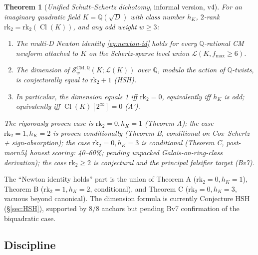\documentclass[11pt,a4paper]{amsart}
\newtheorem{theorem}{Theorem}[section]
\theoremstyle{definition}
\DeclareMathOperator{\Cl}{Cl}
\newcommand{\Q}{\mathbb{Q}}
\newcommand{\Lcal}{\mathcal{L}}
\newcommand{\Scal}{\mathcal{S}}
\newcommand{\hK}{h_{K}}
\newcommand{\rktwo}{\mathrm{rk}_2}
\begin{document}
\begin{theorem}[\emph{Unified Schutt--Schertz dichotomy}, informal version, v4]\label{thm:dichotomy-v4-informal}
For an imaginary quadratic field $K = \Q(\sqrt{D})$ with class number $\hK$, $2$-rank $\rktwo = \rktwo(\Cl(K))$, and any odd weight $w \ge 3$:
\begin{enumerate}[leftmargin=2em]
  \item The multi-D Newton identity \eqref{eq:newton-id} holds for every $\Q$-rational CM newform attached to $K$ on the Schertz-sparse level union $\Lcal(K, f_{\max} \ge 6)$.
  \item The dimension of $\Scal_w^{\mathrm{CM},\Q}(K; \Lcal(K))$ over $\Q$, modulo the action of $\Q$-twists, is conjecturally equal to $\rktwo + 1$ (HSH).
  \item In particular, the dimension equals 1 iff $\rktwo = 0$, equivalently iff $\hK$ is odd; equivalently iff $\Cl(K)[2^\infty] = 0$ (A').
\end{enumerate}
The rigorously proven case is $\rktwo = 0, \hK = 1$ (Theorem A); the case $\rktwo = 1, \hK = 2$ is proven conditionally (Theorem B, conditional on Cox--Schertz + sign-absorption); the case $\rktwo = 0, \hK = 3$ is conditional (Theorem C, post-morn54 honest scoring: 40--60\%; pending unpacked Galois-on-ring-class derivation); the case $\rktwo \ge 2$ is conjectural and the principal falsifier target (Bv7).
\end{theorem}

The ``Newton identity holds'' part is the union of Theorem A ($\rktwo = 0, \hK = 1$), Theorem B ($\rktwo = 1, \hK = 2$, conditional), and Theorem C ($\rktwo = 0, \hK = 3$, vacuous beyond canonical). The dimension formula is currently Conjecture HSH (\S\ref{sec:HSH}), supported by 8/8 anchors but pending Bv7 confirmation of the biquadratic case.

\subsection{Discipline}\label{sec:discipline}
\end{document}
